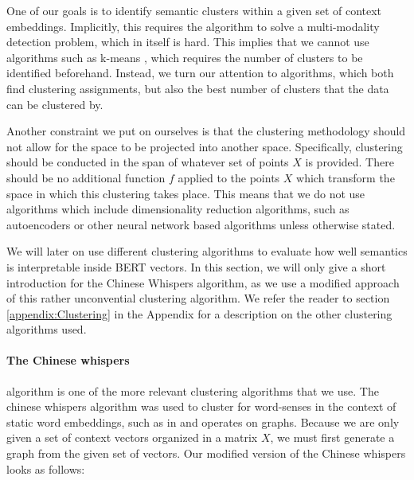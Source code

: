 \documentclass[a4paper,12pt,twoside,openright]{report}
\begin{document}
One of our goals is to identify semantic clusters within a given set of context embeddings.
Implicitly, this requires the algorithm to solve a multi-modality detection problem, which in itself is hard.
This implies that we cannot use algorithms such as k-means \cite{lloyd57, macqueen67}, which requires the number of clusters to be identified beforehand.
Instead, we turn our attention to algorithms, which both find clustering assignments, but also the best number of clusters that the data can be clustered by.

Another constraint we put on ourselves is that the clustering methodology should not allow for the space to be projected into another space.
Specifically, clustering should be conducted in the span of whatever set of points $X$ is provided.
There should be no additional function $f$ applied to the points $X$ which transform the space in which this clustering takes place.
This means that we do not use algorithms which include dimensionality reduction algorithms, such as autoencoders or other neural network based algorithms unless otherwise stated.

We will later on use different clustering algorithms to evaluate how well semantics is interpretable inside BERT vectors.
In this section, we will only give a short introduction for the Chinese Whispers algorithm, as we use a modified approach of this rather unconvential clustering algorithm.
We refer the reader to section \ref{appendix:Clustering} in the Appendix for a description on the other clustering algorithms used.

\paragraph{The Chinese whispers} algorithm is one of the more relevant clustering algorithms that we use. 
The chinese whispers algorithm was used to cluster for word-senses in the context of static word embeddings, such as in
\cite{pelevina16} and operates on graphs.
Because we are only given a set of context vectors organized in a matrix $X$, we must first generate a graph from the given set of vectors.
Our modified version of the Chinese whispers looks as follows:
\end{document}

